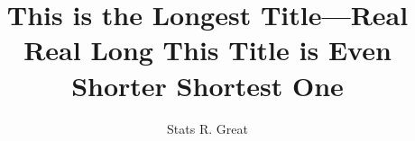 \documentclass[]{statthesisMEMOIR}
\title{This is the Longest Title---Real Real Long \titlebreak This Title is Even Shorter \titlebreak Shortest One}
\author{Stats R. Great}
\begin{document}

	

\nocite{*}		       

	

\appendix	

		
\end{document}

